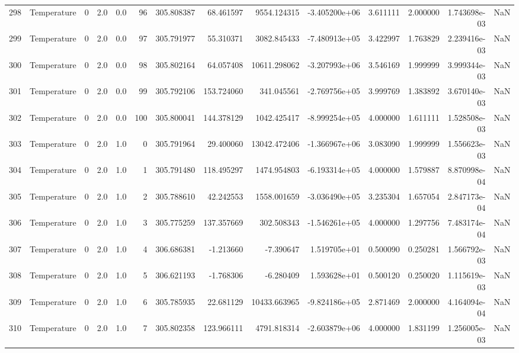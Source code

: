 \begin{tabular}{llrrrrrrrrrrrr}
298 &  Temperature &       0 &  2.0 &  0.0 &   96 &  305.808387 &    68.461597 &    9554.124315 & -3.405200e+06 &  3.611111 &  2.000000 &  1.743698e-03 &      NaN \\
299 &  Temperature &       0 &  2.0 &  0.0 &   97 &  305.791977 &    55.310371 &    3082.845433 & -7.480913e+05 &  3.422997 &  1.763829 &  2.239416e-03 &      NaN \\
300 &  Temperature &       0 &  2.0 &  0.0 &   98 &  305.802164 &    64.057408 &   10611.298062 & -3.207993e+06 &  3.546169 &  1.999999 &  3.999344e-03 &      NaN \\
301 &  Temperature &       0 &  2.0 &  0.0 &   99 &  305.792106 &   153.724060 &     341.045561 & -2.769756e+05 &  3.999769 &  1.383892 &  3.670140e-03 &      NaN \\
302 &  Temperature &       0 &  2.0 &  0.0 &  100 &  305.800041 &   144.378129 &    1042.425417 & -8.999254e+05 &  4.000000 &  1.611111 &  1.528508e-03 &      NaN \\
303 &  Temperature &       0 &  2.0 &  1.0 &    0 &  305.791964 &    29.400060 &   13042.472406 & -1.366967e+06 &  3.083090 &  1.999999 &  1.556623e-03 &      NaN \\
304 &  Temperature &       0 &  2.0 &  1.0 &    1 &  305.791480 &   118.495297 &    1474.954803 & -6.193314e+05 &  4.000000 &  1.579887 &  8.870998e-04 &      NaN \\
305 &  Temperature &       0 &  2.0 &  1.0 &    2 &  305.788610 &    42.242553 &    1558.001659 & -3.036490e+05 &  3.235304 &  1.657054 &  2.847173e-04 &      NaN \\
306 &  Temperature &       0 &  2.0 &  1.0 &    3 &  305.775259 &   137.357669 &     302.508343 & -1.546261e+05 &  4.000000 &  1.297756 &  7.483174e-04 &      NaN \\
307 &  Temperature &       0 &  2.0 &  1.0 &    4 &  306.686381 &    -1.213660 &      -7.390647 &  1.519705e+01 &  0.500090 &  0.250281 &  1.566792e-03 &      NaN \\
308 &  Temperature &       0 &  2.0 &  1.0 &    5 &  306.621193 &    -1.768306 &      -6.280409 &  1.593628e+01 &  0.500120 &  0.250020 &  1.115619e-03 &      NaN \\
309 &  Temperature &       0 &  2.0 &  1.0 &    6 &  305.785935 &    22.681129 &   10433.663965 & -9.824186e+05 &  2.871469 &  2.000000 &  4.164094e-04 &      NaN \\
310 &  Temperature &       0 &  2.0 &  1.0 &    7 &  305.802358 &   123.966111 &    4791.818314 & -2.603879e+06 &  4.000000 &  1.831199 &  1.256005e-03 &      NaN \\

\end{tabular}
